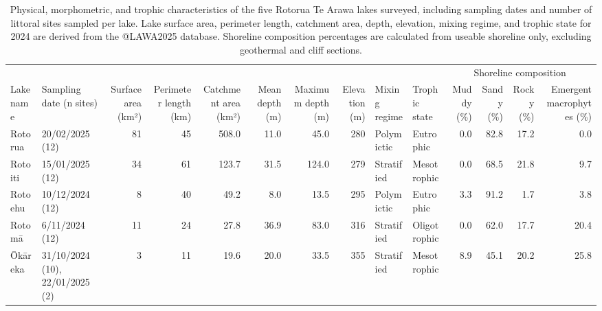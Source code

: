 \documentclass[
  12pt,
  a4paper,
]{scrbook}
\begin{document}
\begin{landscape}
\begin{longtable}[t]{llrrrrrrllrrrr}
\caption{Physical, morphometric, and trophic characteristics of the five Rotorua
Te Arawa lakes surveyed, including sampling dates and number of littoral
sites sampled per lake. Lake surface area, perimeter length, catchment
area, depth, elevation, mixing regime, and trophic state for 2024 are
derived from the @LAWA2025 database. Shoreline composition percentages
are calculated from useable shoreline only, excluding geothermal and
cliff sections.}\tabularnewline

\toprule
\multicolumn{10}{c}{ } & \multicolumn{4}{c}{Shoreline composition} \\
\cmidrule(l{3pt}r{3pt}){11-14}
Lake name & Sampling date (n sites) & Surface area (km²) & Perimeter length (km) & Catchment area (km²) & Mean depth (m) & Maximum depth (m) & Elevation (m) & Mixing regime & Trophic state & Muddy (\%) & Sandy (\%) & Rocky (\%) & Emergent macrophytes (\%)\\
\midrule
Rotorua & 20/02/2025 (12) & 81 & 45 & 508.0 & 11.0 & 45.0 & 280 & Polymictic & Eutrophic & 0.0 & 82.8 & 17.2 & 0.0\\
Rotoiti & 15/01/2025 (12) & 34 & 61 & 123.7 & 31.5 & 124.0 & 279 & Stratified & Mesotrophic & 0.0 & 68.5 & 21.8 & 9.7\\
Rotoehu & 10/12/2024 (12) & 8 & 40 & 49.2 & 8.0 & 13.5 & 295 & Polymictic & Eutrophic & 3.3 & 91.2 & 1.7 & 3.8\\
Rotomā & 6/11/2024 (12) & 11 & 24 & 27.8 & 36.9 & 83.0 & 316 & Stratified & Oligotrophic & 0.0 & 62.0 & 17.7 & 20.4\\
Ōkāreka & 31/10/2024 (10), 22/01/2025 (2) & 3 & 11 & 19.6 & 20.0 & 33.5 & 355 & Stratified & Mesotrophic & 8.9 & 45.1 & 20.2 & 25.8\\
\bottomrule
\end{longtable}
\end{landscape}
\end{document}
